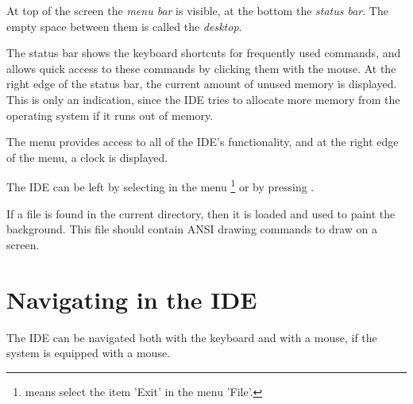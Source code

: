 
At top of the screen the \emph{menu bar} is visible, at the bottom
the \emph{status bar}. The empty space between them is called the
\emph{desktop}.

The status bar shows the keyboard shortcuts for frequently used 
commands, and allows quick access to these commands by clicking 
them with the mouse. 
At the right edge of the status bar, the current amount of unused 
memory is displayed. This is only an indication, since the IDE 
tries to allocate more memory from the operating system if it 
runs out of memory.

The menu provides access to all of the IDE's functionality, and
at the right edge of the menu, a clock is displayed.

The IDE can be left by selecting  in the menu
\footnote{ means select the item 'Exit' in the menu 'File'.}
or by pressing .

\begin{remark}
If a file  is found in the current directory,
then it is loaded and used to paint the background.
This file should contain ANSI drawing commands to draw on a screen.
\end{remark}

\section{Navigating in the IDE}
The IDE can be navigated both with the keyboard and with a mouse, if the
system is equipped with a mouse.
%
%
